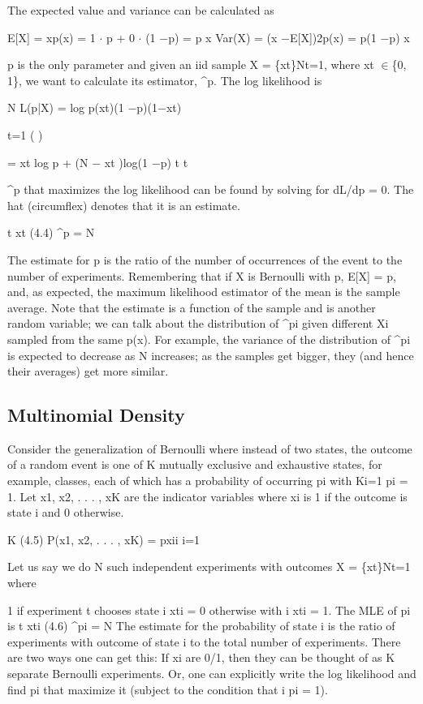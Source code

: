 The expected value and variance can be calculated as

E[X] = xp(x) = 1 $\cdot$ p + 0 $\cdot$ (1 $-$p) = p x Var(X) = (x $-$E[X])2p(x) = p(1 $-$p) x

p is the only parameter and given an iid sample X = \{xt\}Nt=1, where xt $\in$\{0, 1\}, we want to calculate its estimator, \textasciicircum{}p. The log likelihood is

N L(p|X) = log p(xt)(1 $-$p)(1$-$xt)

t=1 ( )

= xt log p + (N $-$ xt )log(1 $-$p) t t

\textasciicircum{}p that maximizes the log likelihood can be found by solving for dL/dp = 0. The hat (circumflex) denotes that it is an estimate.

t xt (4.4) \textasciicircum{}p = N

The estimate for p is the ratio of the number of occurrences of the event to the number of experiments. Remembering that if X is Bernoulli with p, E[X] = p, and, as expected, the maximum likelihood estimator of the mean is the sample average. Note that the estimate is a function of the sample and is another random variable; we can talk about the distribution of \textasciicircum{}pi given different Xi sampled from the same p(x). For example, the variance of the distribution of \textasciicircum{}pi is expected to decrease as N increases; as the samples get bigger, they (and hence their averages) get more similar.

\subsection{Multinomial Density}

Consider the generalization of Bernoulli where instead of two states, the outcome of a random event is one of K mutually exclusive and exhaustive states, for example, classes, each of which has a probability of occurring pi with Ki=1 pi = 1. Let x1, x2, . . . , xK are the indicator variables where xi is 1 if the outcome is state i and 0 otherwise.

K (4.5) P(x1, x2, . . . , xK) = pxii i=1

Let us say we do N such independent experiments with outcomes X = \{xt\}Nt=1 where

1 if experiment t chooses state i xti = 0 otherwise with i xti = 1. The MLE of pi is t xti (4.6) \textasciicircum{}pi = N The estimate for the probability of state i is the ratio of experiments with outcome of state i to the total number of experiments. There are two ways one can get this: If xi are 0/1, then they can be thought of as K separate Bernoulli experiments. Or, one can explicitly write the log likelihood and find pi that maximize it (subject to the condition that i pi = 1).

